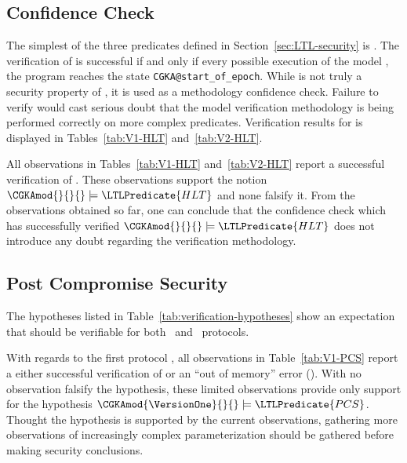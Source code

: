 \hypertarget{sec:confidence-check}{%
\subsection{Confidence Check}\label{sec:confidence-check}}

The simplest of the three  predicates defined in Section\ \ref{sec:LTL-security} is .
The verification of  is successful if and only if every possible execution of the model \CGKAmod{}{}{}, the program reaches the state \texttt{CGKA@start\_of\_epoch}.
While  is not truly a security property of \CGKAmod{}{}{}, it is used as a methodology confidence check.
Failure to verify  would cast serious doubt that the model verification methodology is being performed correctly on more complex  predicates.
Verification results for  is displayed in Tables\ \ref{tab:V1-HLT} and\ \ref{tab:V2-HLT}.

All observations in Tables\ \ref{tab:V1-HLT} and\ \ref{tab:V2-HLT} report a successful verification of .
These observations support the notion \( \CGKAmod{}{}{} \models \LTLPredicate{HLT} \) and none falsify it.
From the observations obtained so far, one can conclude that the confidence check which has successfully verified \( \CGKAmod{}{}{} \models \LTLPredicate{HLT} \) does not introduce any doubt regarding the verification methodology.


\hypertarget{sec:post-compromise-security}{%
\subsection{Post Compromise Security}\label{sec:post-compromise-security}}

The hypotheses listed in Table\ \ref{tab:verification-hypotheses} show an expectation that  should be verifiable for both \VersionOne\ and \VersionTwo\ protocols.

With regards to the first protocol \VersionOne, all observations in Table\ \ref{tab:V1-PCS} report a either successful verification of  or an ``out of memory'' error (\OutOfMemory).
With no observation falsify the hypothesis, these limited observations provide only support for the hypothesis \( \CGKAmod{\VersionOne}{}{} \models \LTLPredicate{PCS} \).
Thought the hypothesis is supported by the current observations, gathering more observations of increasingly complex \CGKAmod{\VersionOne}{}{} parameterization should be gathered before making security conclusions.


